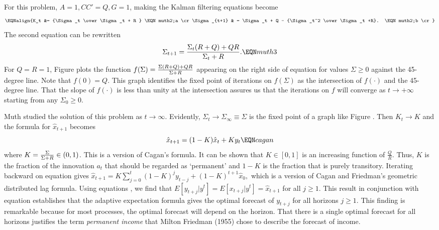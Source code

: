 
  For this problem,  $A=1, CC'=Q, G=1$, making the Kalman filtering
 equations  become
$$\EQNalign{K_t &= {\Sigma_t   \over \Sigma_t + R } \EQN muth2;a \cr
            \Sigma_{t+1} & = \Sigma_t + Q - {\Sigma_t^2 \over
                            \Sigma_t +R}. \EQN muth2;b \cr }$$
The second equation can be rewritten
$$ \Sigma_{t+1} = { \Sigma_t(R+Q) + Q R \over \Sigma_t + R }. \EQN muth3$$
For $Q=R=1$, Figure  plots the function
$f(\Sigma)
 = {\Sigma(R+Q) + Q R \over \Sigma + R }$ appearing on the right side
of equation  for values $\Sigma \geq 0$ against the
45-degree line. Note that $f(0) = Q$.
This graph identifies the fixed point of iterations on
$f(\Sigma)$ as the intersection of $f(\cdot)$ and the 45-degree line.
That the slope of $f(\cdot)$ is less than unity at the intersection
assures us that the iterations on $f$ will converge as $t \rightarrow
+\infty$ starting from any $\Sigma_0 \geq 0$.

   Muth studied the solution of this problem  as
$t \rightarrow \infty$.  Evidently, $\Sigma_t \rightarrow \Sigma_\infty
\equiv \Sigma$
is the fixed point of a graph like Figure .
Then $K_t \rightarrow K$ and the formula for
$\hat x_{t+1}$
becomes
$$ \hat x_{t+1} = (1-K)\hat x_t + K  y_t \EQN cagan$$
where $K  = {\Sigma \over \Sigma + R} \in (0,1)$.   This
is a version of Cagan's  formula. It can be shown that
$K \in [0,1]$ is an increasing function of ${\frac{Q}{R}}$.  Thus, $K$ is the fraction
of  the innovation  $a_t$ that should be regarded as `permanent' and $1-K$ is the fraction that is
purely transitory.    Iterating
backward on equation  gives
$ \hat x_{t+1} = K  \sum_{j=0}^t (1-K)^j y_{t-j} +  (1-K)^{t+1} \hat x_0,$
which is a version of Cagan and Friedman's geometric
distributed lag formula.   Using equations , we find
that $E [y_{t+j} \vert y^t]  = E [x_{t+j} \vert y^t] =
\hat x_{t+1}$ for all $j \geq 1$.  This result in conjunction with
equation 
establishes that the adaptive expectation formula 
gives the optimal forecast of $y_{t+j}$ for all horizons $j \geq 1$.
This finding  is remarkable  because for most processes,
the optimal forecast will depend on the horizon.  That
there is a single optimal forecast for all horizons  justifies the term {\it permanent income\/} that Milton
Friedman (1955) chose to describe the forecast of income.

